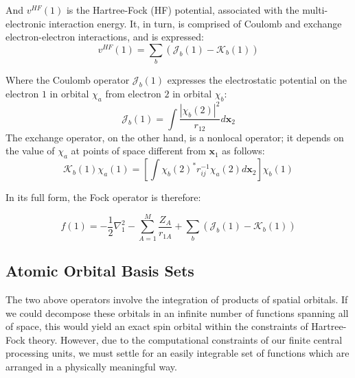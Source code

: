 And $v^{HF}(1)$ is the Hartree-Fock (HF) potential, associated with the multi-electronic interaction energy. It, in turn, is comprised of Coulomb and exchange electron-electron interactions, and is expressed:
\begin{equation}
    v^{HF}(1)=\sum_{b}(\mathcal{J}_b(1) - \mathcal{K}_b(1))
\end{equation}

Where the Coulomb operator $\mathcal{J}_b(1)$ expresses the electrostatic potential on the electron $1$ in orbital $\chi_a$ from electron $2$ in orbital $\chi_b$:
\begin{equation}
    \mathcal{J}_b(1) = \int \frac{|\chi_b(2)|^2}{r_{12}} d\bm{x}_2
\end{equation}
The exchange operator, on the other hand, is a nonlocal operator; it depends on the value of $\chi_a$ at points of space different from $\bm{x}_1$ as follows:
\begin{equation}
    \mathcal{K}_b(1)\chi_a(1) = \left[\int \chi_b(2)^*r^{-1}_{ij}\chi_a(2) d\bm{x}_2\right]\chi_b(1)
\end{equation}

In its full form, the Fock operator is therefore:\cite{Hartree1935,Fock1930,Fock1930a}

\begin{equation}
    f(1) = - \frac{1}{2} \nabla^2_1 - \sum_{A=1}^M \frac{Z_A}{r_{1A}} + \sum_{b} (\mathcal{J}_b(1) - \mathcal{K}_b(1))
\end{equation}


\subsection{Atomic Orbital Basis Sets}
The two above operators involve the integration of products of spatial orbitals. If we could decompose these orbitals in an infinite number of functions spanning all of space, this would yield an exact spin orbital within the constraints of Hartree-Fock theory. However, due to the computational constraints of our finite central processing units, we must settle for an easily integrable set of functions which are arranged in a physically meaningful way. 

